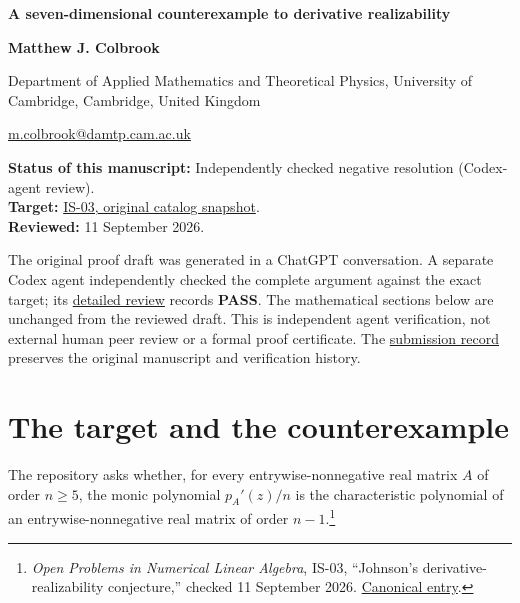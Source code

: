 \documentclass[10pt,a4paper]{article}
\begin{document}
{\raggedright\Large\bfseries A seven-dimensional counterexample to
derivative realizability\par}
\vspace{0.4em}
{\normalsize\bfseries Matthew J. Colbrook\par}
{\small Department of Applied Mathematics and Theoretical Physics,
University of Cambridge, Cambridge, United Kingdom\par}
{\small\href{mailto:m.colbrook@damtp.cam.ac.uk}{m.colbrook@damtp.cam.ac.uk}\par}
\vspace{0.6em}
\textbf{Status of this manuscript:} Independently checked negative
resolution (Codex-agent review).\\
\textbf{Target:}
\href{https://github.com/ajt60gaibb/OpenProblemsInNLA/blob/b4123194697bdf6f8f82518c1dd7d6c40a30c2e0/eigenvalues-and-inverse-problems/IS-03/README.md}{IS-03,
original catalog snapshot}.\\
\textbf{Reviewed:} 11 September 2026.

The original proof draft was generated in a ChatGPT conversation. A
separate Codex agent independently checked the complete argument against
the exact target; its
\href{https://github.com/ajt60gaibb/OpenProblemsInNLA/blob/main/references/colbrook-additional-2026-09-11/verification/reviews/IS-03-review.md}{detailed
review} records \textbf{PASS}. The mathematical sections below are
unchanged from the reviewed draft. This is independent agent
verification, not external human peer review or a formal proof
certificate. The
\href{https://github.com/ajt60gaibb/OpenProblemsInNLA/blob/main/references/colbrook-additional-2026-09-11/README.md}{submission
record} preserves the original manuscript and verification history.

\section{The target and the
counterexample}\label{the-target-and-the-counterexample}

The repository asks whether, for every entrywise-nonnegative real matrix
\(A\) of order \(n\ge5\), the monic polynomial \(p_A'(z)/n\) is the
characteristic polynomial of an entrywise-nonnegative real matrix of
order \(n-1\).\footnote{\emph{Open Problems in Numerical Linear
  Algebra}, IS-03, ``Johnson's derivative-realizability conjecture,''
  checked 11 September 2026.
  \href{https://github.com/ajt60gaibb/OpenProblemsInNLA/blob/main/eigenvalues-and-inverse-problems/IS-03/README.md}{Canonical
  entry}.}
\end{document}

